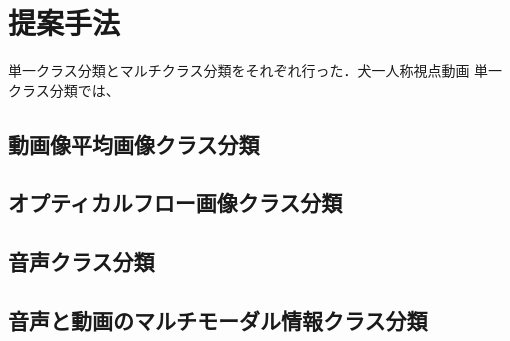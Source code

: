 \chapter{提案手法}
単一クラス分類とマルチクラス分類をそれぞれ行った．犬一人称視点動画
単一クラス分類では、
\section{動画像平均画像クラス分類}
\section{オプティカルフロー画像クラス分類}
\section{音声クラス分類}
\section{音声と動画のマルチモーダル情報クラス分類}

